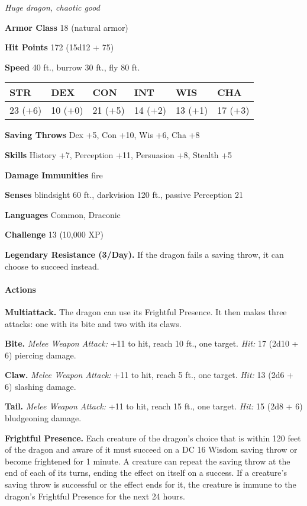 \documentclass[
]{article}
\begin{document}
\emph{Huge dragon, chaotic good}

\textbf{Armor Class} 18 (natural armor)

\textbf{Hit Points} 172 (15d12 + 75)

\textbf{Speed} 40 ft., burrow 30 ft., fly 80 ft.

\begin{longtable}[]{@{}llllll@{}}
\toprule
STR & DEX & CON & INT & WIS & CHA\tabularnewline
\midrule
\endhead
23 (+6) & 10 (+0) & 21 (+5) & 14 (+2) & 13 (+1) & 17 (+3)\tabularnewline
\bottomrule
\end{longtable}

\textbf{Saving Throws} Dex +5, Con +10, Wis +6, Cha +8

\textbf{Skills} History +7, Perception +11, Persuasion +8, Stealth +5

\textbf{Damage Immunities} fire

\textbf{Senses} blindsight 60 ft., darkvision 120 ft., passive
Perception 21

\textbf{Languages} Common, Draconic

\textbf{Challenge} 13 (10,000 XP)

\textbf{Legendary Resistance (3/Day).} If the dragon fails a saving
throw, it can choose to succeed instead.

\hypertarget{actions-44}{%
\paragraph{Actions}\label{actions-44}}

\textbf{Multiattack.} The dragon can use its Frightful Presence. It then
makes three attacks: one with its bite and two with its claws.

\textbf{Bite.} \emph{Melee Weapon Attack:} +11 to hit, reach 10 ft., one
target. \emph{Hit:} 17 (2d10 + 6) piercing damage.

\textbf{Claw.} \emph{Melee Weapon Attack:} +11 to hit, reach 5 ft., one
target. \emph{Hit:} 13 (2d6 + 6) slashing damage.

\textbf{Tail.} \emph{Melee Weapon Attack:} +11 to hit, reach 15 ft., one
target. \emph{Hit:} 15 (2d8 + 6) bludgeoning damage.

\textbf{Frightful Presence.} Each creature of the dragon's choice that
is within 120 feet of the dragon and aware of it must succeed on a DC 16
Wisdom saving throw or become frightened for 1 minute. A creature can
repeat the saving throw at the end of each of its turns, ending the
effect on itself on a success. If a creature's saving throw is
successful or the effect ends for it, the creature is immune to the
dragon's Frightful Presence for the next 24 hours.
\end{document}
